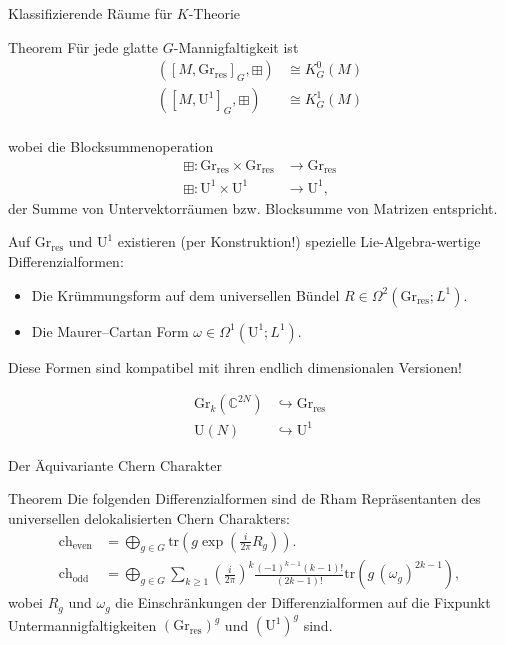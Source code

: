 \documentclass[12pt,utf8,notheorems,compress,t]{beamer}
\renewcommand{\_}{\mathpunct{.}}
\newcommand{\?}{\,{:}\,}
\newcommand{\CC}{\mathbb{C}}
\newcommand{\tr}{\mathrm{tr}}
\newcommand{\ch}{\mathrm{ch}}
\newcommand{\grres}{\mathrm{Gr}_{\mathrm{res}}}
\begin{document}
\begin{frame}{Klassifizierende Räume für $K$-Theorie}
    \begin{block}{Theorem}
        Für jede glatte $G$-Mannigfaltigkeit ist 
        \begin{align*}
            ([M, \mathrm{Gr}_{\mathrm{res}}]_G,\boxplus) &\cong K_G^0(M) \\
            ([M, \mathrm{U}^1]_G,\boxplus) &\cong K_G^1(M) \\
        \end{align*}
    \end{block}
    wobei die Blocksummenoperation
    \begin{align*}
        \boxplus\colon \grres \times \grres &\to \grres \\\boxplus\colon
        \mathrm U^1 \times \mathrm
        U^1 &\to \mathrm U^1,
    \end{align*}
    der Summe von Untervektorräumen bzw. Blocksumme von Matrizen entspricht.
\end{frame}
\begin{frame}
    Auf $\grres$ und $\mathrm U^1$ existieren (per Konstruktion!) spezielle
    Lie-Algebra-wertige Differenzialformen:
    \begin{itemize}
        \item Die Krümmungsform auf dem universellen Bündel $R\in
            \Omega^2(\mathrm{Gr}_{\mathrm{res}}; L^1)$.
        \item Die Maurer--Cartan Form $\omega\in \Omega^1(\mathrm U^1;
            L^1)$.
    \end{itemize}
    Diese Formen sind kompatibel mit ihren endlich dimensionalen Versionen!
    \begin{exampleblock}{}
        \vspace{-1em}
        \begin{align*}
            \mathrm{Gr}_{k}(\CC^{2N}) &\hookrightarrow \grres \\
            \mathrm{U}(N) &\hookrightarrow \mathrm U^1
        \end{align*}
    \end{exampleblock}
\end{frame}
\begin{frame}{Der Äquivariante Chern Charakter}
    \begin{block}{Theorem}
        Die folgenden Differenzialformen sind de Rham Repräsentanten des
        universellen delokalisierten Chern Charakters:
        \begin{align*}
            \ch_{\mathrm{even}} &= \bigoplus_{g\in G} \tr \left( g \exp\left(
            \frac{i}{2\pi}R_g \right) \right). \\
            \ch_{\mathrm{odd}} &= \bigoplus_{g\in G} \sum_{k\geq 1}
            \left(\frac{i}{2\pi}\right)^{k}
            \frac{(-1)^{k-1}(k-1)!}{(2k-1)!}\tr \left(g\,
            (\omega_g)^{2k-1}\right),
        \end{align*}
        wobei $R_g$ und $\omega_g$ die Einschränkungen der Differenzialformen
        auf die Fixpunkt Untermannigfaltigkeiten $(\grres)^g$ und $(\mathrm
        U^1)^g$ sind.
    \end{block}
\end{frame}
\end{document}
